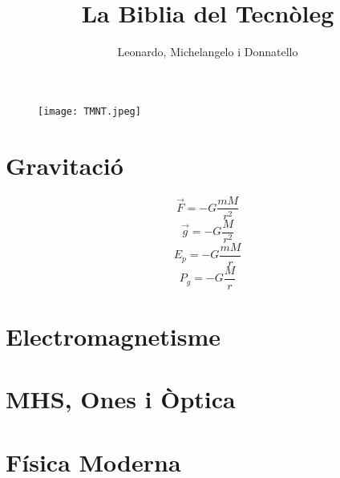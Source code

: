 \documentclass{article}
\title{La Biblia del Tecnòleg}
\author{Leonardo, Michelangelo i Donnatello}
\begin{document}
\begin{figure}
\centering
\texttt{[image: TMNT.jpeg]}
\end{figure}

\maketitle

\newpage
\section{Gravitació}
\[\vec{F}=-G\frac{mM}{r^2}\]
\[\vec{g}=-G\frac{M}{r^2}\]
\[E_p=-G\frac{mM}{r}\]
\[P_g=-G\frac{M}{r}\]
\section{Electromagnetisme}
\section{MHS, Ones i Òptica}
\section{Física Moderna}
\end{document}
